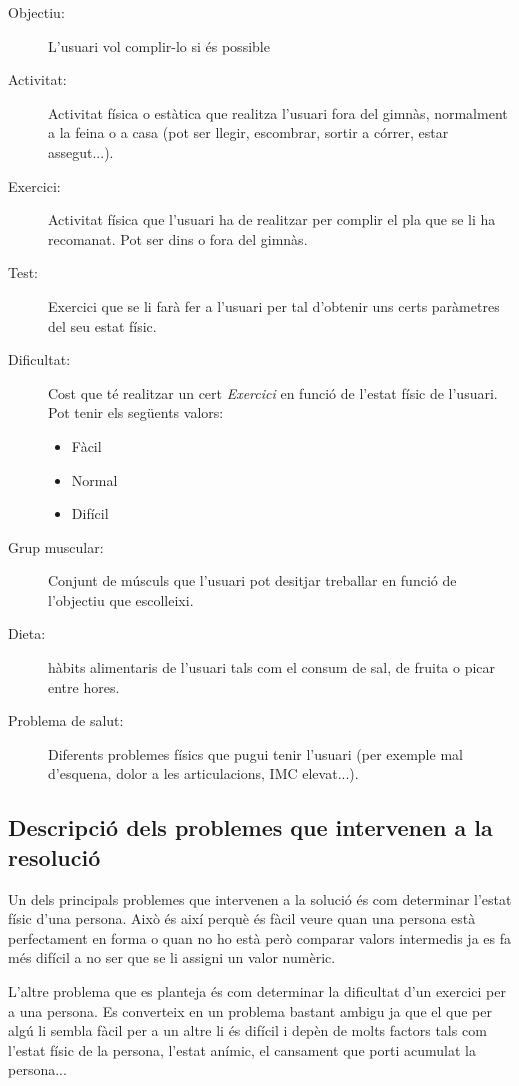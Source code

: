 \documentclass[a4paper, 12pt, UTF8]{article}
\begin{document}
\begin{description}
	\item[Objectiu:]  L'usuari vol complir-lo si és possible
	\item[Activitat:] Activitat física o estàtica que realitza l'usuari fora del gimnàs, normalment a la feina o a casa (pot ser llegir, escombrar, sortir a córrer, estar assegut...).
	\item[Exercici:]  Activitat física que l'usuari ha de realitzar per complir el pla que se li ha recomanat. Pot ser dins o fora del gimnàs.
	\item[Test:] Exercici que se li farà fer a l'usuari per tal d'obtenir uns certs paràmetres del seu estat físic.
	\item[Dificultat:] Cost que té realitzar un cert \emph{Exercici} en funció de l'estat físic de l'usuari. Pot tenir els següents valors:
	\begin{itemize}
		\item Fàcil
		\item Normal
		\item Difícil
	\end{itemize}
	\item[Grup muscular:] Conjunt de músculs que l'usuari pot desitjar treballar en funció de l'objectiu que escolleixi.
	\item[Dieta:] hàbits alimentaris de l'usuari tals com el consum de sal, de fruita o picar entre hores.
	\item[Problema de salut:] Diferents problemes físics que pugui tenir l'usuari (per exemple mal d'esquena, dolor a les articulacions, IMC elevat...).
	
\end{description}

\subsection{Descripció dels problemes que intervenen a la resolució}

Un dels principals problemes que intervenen a la solució és com determinar l'estat físic d'una persona. Això és així perquè és fàcil veure quan una persona està perfectament en forma o quan no ho està però comparar valors intermedis ja es fa més difícil a no ser que se li assigni un valor numèric.

L'altre problema que es planteja és com determinar la dificultat d'un exercici per a una persona. Es converteix en un problema bastant ambigu ja que el que per algú li sembla fàcil per a un altre li és difícil i depèn de molts factors tals com l'estat físic de la persona, l'estat anímic, el cansament que porti acumulat la persona...
\end{document}
